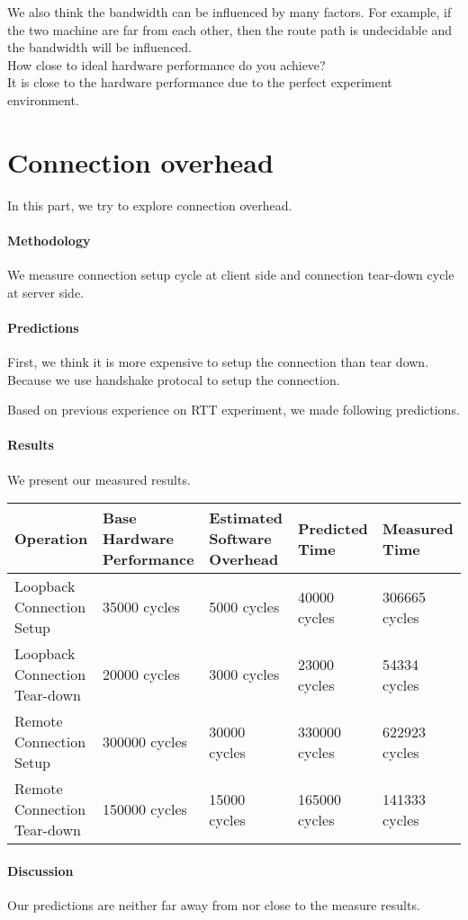We also think the bandwidth can be influenced by many factors. For example, if the two machine are far from each other, then the route path is undecidable and the bandwidth will be influenced. \\

How close to ideal hardware performance do you achieve? \\
It is close to the hardware performance due to the perfect experiment environment.

\section{Connection overhead}
In this part, we try to explore connection overhead.

\paragraph{Methodology}
We measure connection setup cycle at client side and connection tear-down cycle at server side.

\paragraph{Predictions}
First, we think it is more expensive to setup the connection than tear down. Because we use handshake protocal to setup the connection.

Based on previous experience on RTT experiment, we made following predictions.

\paragraph{Results}
We present our measured results.

\begin{center}
\begin{tabular}{| p{3cm} | p{3cm} | p{3cm} | p{3cm} | p{3cm} |}
Operation  & Base Hardware Performance  & Estimated Software Overhead  & Predicted Time  & Measured Time   \\
\hline
Loopback Connection Setup & 35000 cycles& 5000 cycles& 40000 cycles& 306665 cycles \\
Loopback Connection Tear-down & 20000 cycles& 3000 cycles& 23000 cycles& 54334 cycles \\
Remote Connection Setup & 300000  cycles& 30000 cycles& 330000 cycles& 622923 cycles\\
Remote Connection Tear-down & 150000  cycles& 15000 cycles& 165000 cycles& 141333 cycles\\
\end{tabular}
\end{center}


\paragraph{Discussion}
Our predictions are neither far away from nor close to the measure results.

